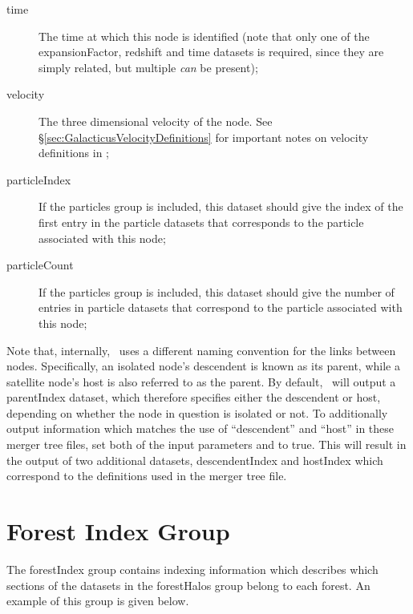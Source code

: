\begin{description}
 \item [{\normalfont \ttfamily time}] The time at which this node is identified (note that only one of the {\normalfont \ttfamily expansionFactor}, {\normalfont \ttfamily redshift} and {\normalfont \ttfamily time} datasets is required, since they are simply related, but multiple \emph{can} be present);
 \item [{\normalfont \ttfamily velocity}] The three dimensional velocity of the node. See \S\ref{sec:GalacticusVelocityDefinitions} for important notes on velocity definitions in \glc;
 \item [{\normalfont \ttfamily particleIndex}] If the {\normalfont \ttfamily particles} group is included, this dataset should give the index of the first entry in the particle datasets that corresponds to the particle associated with this node;
 \item [{\normalfont \ttfamily particleCount}] If the {\normalfont \ttfamily particles} group is included, this dataset should give the number of entries in particle datasets that correspond to the particle associated with this node;
\end{description}

Note that, internally, \glc\ uses a different naming convention for the links between nodes. Specifically, an isolated node's descendent is known as its parent, while a satellite node's host is also referred to as the parent. By default, \glc\ will output a {\normalfont \ttfamily parentIndex} dataset, which therefore specifies either the descendent or host, depending on whether the node in question is isolated or not. To additionally output information which matches the use of ``descendent'' and ``host'' in these merger tree files, set both of the input parameters {\normalfont \ttfamily [outputDescendentIndices]} and {\normalfont \ttfamily [outputHostIndices]} to {\normalfont \ttfamily true}. This will result in the output of two additional datasets, {\normalfont \ttfamily descendentIndex} and {\normalfont \ttfamily hostIndex} which correspond to the definitions used in the merger tree file.

\section{Forest Index Group}

The {\normalfont \ttfamily forestIndex} group contains indexing information which describes which sections of the datasets in the {\normalfont \ttfamily forestHalos} group belong to each forest. An example of this group is given below.

